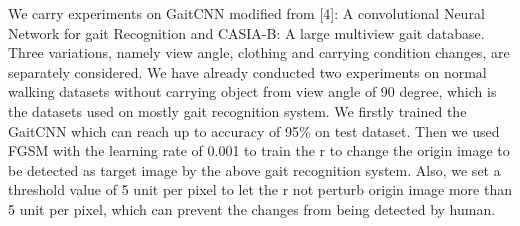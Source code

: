 \documentclass[letterpaper]{article} %
\begin{document}
We carry experiments on GaitCNN modified from [4]: A convolutional Neural Network for gait Recognition and CASIA-B: A large multiview gait database. Three variations, namely view angle, clothing and carrying condition changes, are separately considered. We have already conducted two experiments on normal walking datasets without carrying object from view angle of 90 degree, which is the datasets used on mostly gait recognition system. We firstly trained the GaitCNN which can reach up to accuracy of 95\% on test dataset. Then we used FGSM with the learning rate of 0.001 to train the r to change the origin image to be detected as target image by the above gait recognition system. Also, we set a threshold value of 5 unit per pixel to let the r not perturb origin image more than 5 unit per pixel, which can prevent the changes from being detected by human.
\end{document}
